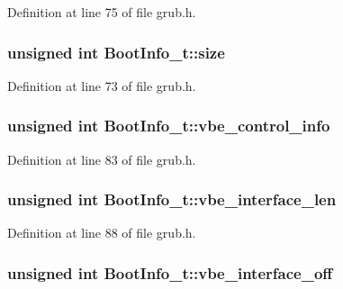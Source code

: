 Definition at line 75 of file grub.\+h.

\hypertarget{structBootInfo__t_a761344d9a2bf10e1551dca7bd77f90cf}{
\subsubsection[{size}]{\setlength{\rightskip}{0pt plus 5cm}unsigned int Boot\+Info\+\_\+t\+::size}}\label{structBootInfo__t_a761344d9a2bf10e1551dca7bd77f90cf}


Definition at line 73 of file grub.\+h.

\hypertarget{structBootInfo__t_a8a09488fd20d514ccd02e07e5ca45d6d}{
\subsubsection[{vbe\+\_\+control\+\_\+info}]{\setlength{\rightskip}{0pt plus 5cm}unsigned int Boot\+Info\+\_\+t\+::vbe\+\_\+control\+\_\+info}}\label{structBootInfo__t_a8a09488fd20d514ccd02e07e5ca45d6d}


Definition at line 83 of file grub.\+h.

\hypertarget{structBootInfo__t_a47ae9ab2b4242be9be167ea095956097}{
\subsubsection[{vbe\+\_\+interface\+\_\+len}]{\setlength{\rightskip}{0pt plus 5cm}unsigned int Boot\+Info\+\_\+t\+::vbe\+\_\+interface\+\_\+len}}\label{structBootInfo__t_a47ae9ab2b4242be9be167ea095956097}


Definition at line 88 of file grub.\+h.

\hypertarget{structBootInfo__t_a2359d311e9a6d45dcebb8e6fae1a1f63}{
\subsubsection[{vbe\+\_\+interface\+\_\+off}]{\setlength{\rightskip}{0pt plus 5cm}unsigned int Boot\+Info\+\_\+t\+::vbe\+\_\+interface\+\_\+off}}\label{structBootInfo__t_a2359d311e9a6d45dcebb8e6fae1a1f63}



